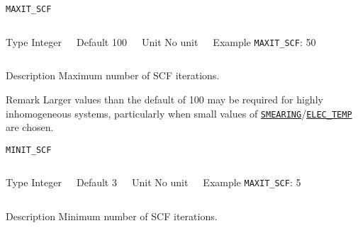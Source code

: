 \begin{frame}[allowframebreaks]{\texttt{{MAXIT\_SCF}}} \label{MAXIT_SCF}
\vspace*{-12pt}
\begin{columns}
\begin{block}{Type}
Integer
\end{block}

\begin{block}{Default}
100
\end{block}

\begin{block}{Unit}
No unit
\end{block}

\begin{block}{Example}
\texttt{MAXIT\_SCF}: 50
\end{block}
\end{columns}

\begin{block}{Description}
Maximum number of SCF iterations.
\end{block}

\begin{block}{Remark}
Larger values than the default of 100 may be required for highly inhomogeneous systems, particularly when small values of \hyperlink{SMEARING}{\texttt{SMEARING}}/\hyperlink{ELEC_TEMP}{\texttt{ELEC\_TEMP}} are chosen. 
\end{block}

\end{frame}


\begin{frame}[allowframebreaks]{\texttt{{MINIT\_SCF}}} \label{MINIT_SCF}
\vspace*{-12pt}
\begin{columns}
\begin{block}{Type}
Integer
\end{block}

\begin{block}{Default}
3
\end{block}

\begin{block}{Unit}
No unit
\end{block}

\begin{block}{Example}
\texttt{MAXIT\_SCF}: 5
\end{block}
\end{columns}

\begin{block}{Description}
Minimum number of SCF iterations.
\end{block}

\end{frame}


